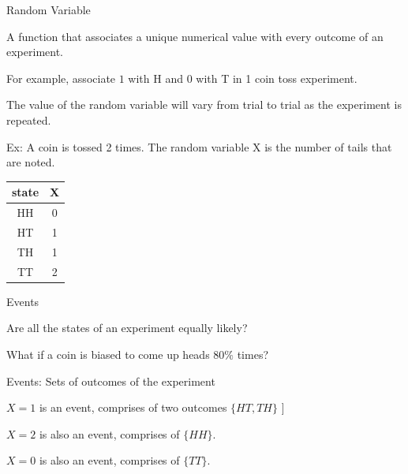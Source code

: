 \documentclass{beamer}\usepackage[]{graphicx}\usepackage[]{color}
\begin{document}
\begin{frame}[fragile]{Random Variable \;\;}

A function that associates a unique numerical value with every outcome of an experiment. \pause \newline

For example, associate $1$ with H and $0$ with T in 1 coin toss experiment. \pause \newline

The value of the random variable will vary from trial to trial as the experiment is repeated. \pause \newline

Ex: A coin is tossed 2 times. The random variable X is the number of tails that are noted.

\begin{tabular}{|c|c|}
\hline
state & X \\ \hline
HH & 0 \\ \hline
HT & 1 \\ \hline
TH & 1 \\ \hline
TT & 2 \\ \hline
\end{tabular}

\end{frame}


\begin{frame}[fragile]{Events \;\;}

Are all the states of an experiment equally likely? \pause \newline

What if a coin is biased to come up heads $80 \%$ times? \pause \newline

Events: Sets of outcomes of the experiment \pause \newline

 $X=1$ is an event, comprises of two outcomes $\{HT, TH \}$ \pause ]\newline

 $X=2$ is also an event, comprises of $\{ HH \}$. \pause \newline

 $X=0$ is also an event, comprises of $\{ TT \}$.

\end{frame}
\end{document}
